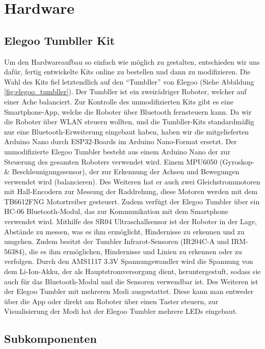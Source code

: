 \chapter{Hardware}
\label{sec:hardware}
\section{Elegoo Tumbller Kit}
\label{subsec:elegoo_tumbller}
Um den Hardwareaufbau so einfach wie möglich zu gestalten,
entschieden wir uns dafür,
fertig entwickelte Kits online zu bestellen und dann zu modifizieren.
%
Die Wahl des Kits fiel letztendlich auf den ``Tumbller'' von Elegoo (Siehe Abbildung \ref{fig:elegoo_tumbller}).
%
Der Tumbller ist ein zweirädriger Roboter, welcher auf einer Ache balanciert.
%
Zur Kontrolle des unmodifizierten Kits gibt es eine Smartphone-App,
welche die Roboter über Bluetooth fernsteuern kann.
%
Da wir die Roboter über WLAN steuern wollten, 
und die Tumbller-Kits standardmäßig nur eine Bluetooth-Erweiterung eingebaut haben,
haben wir die mitgelieferten Arduino Nano durch ESP32-Boards im Arduino Nano-Format ersetzt.
%
Der unmodifizierte Elegoo Tumbler besteht aus einem Arduino Nano der zur Steuerung des gesamten Roboters verwendet wird. Einem MPU6050 (Gyroskop- & Beschleunigungssensor), der zur Erkennung der Achsen und Bewegungen verwendet wird (balancieren). Des Weiteren hat er auch zwei Gleichstrommotoren mit Hall-Encodern zur Messung der Raddrehung, diese Motoren werden mit dem TB6612FNG Motortreiber gesteuert. Zudem verfügt der Elegoo Tumbler über ein HC-06 Bluetooth-Modul, das zur Kommunikation mit dem Smartphone verwendet wird. Mithilfe des SR04 Ultraschallsensor ist der Roboter in der Lage, Abstände zu messen, was es ihm ermöglicht, Hindernisse zu erkennen und zu umgehen.  Zudem besitzt der Tumbler Infrarot-Sensoren (IR204C-A und IRM-56384), die es ihm ermöglichen, Hindernisse und Linien zu erkennen oder zu verfolgen. Durch den AMS1117 3.3V Spannungswandler wird die Spannung von dem Li-Ion-Akku, der als Hauptstromversorgung dient, heruntergestuft, sodass sie auch für das Bluetooth-Modul und die Sensoren verwendbar ist. Des Weiteren ist der Elegoo Tumbler mit mehreren Modi ausgestattet. Diese kann man entweder über die App oder direkt am Roboter über einen Taster steuern, zur Visualisierung der Modi hat der Elegoo Tumbler mehrere LEDs eingebaut.
\section{Subkomponenten}
\label{subsec:subkomponenten}
%
